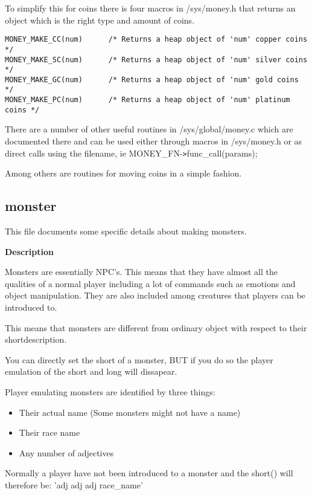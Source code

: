 To simplify this for coins there is four macros in /sys/money.h that
returns an object which is the right type and amount of coins.

\begin{verbatim}
MONEY_MAKE_CC(num)      /* Returns a heap object of 'num' copper coins */
MONEY_MAKE_SC(num)      /* Returns a heap object of 'num' silver coins */
MONEY_MAKE_GC(num)      /* Returns a heap object of 'num' gold coins */
MONEY_MAKE_PC(num)      /* Returns a heap object of 'num' platinum coins */
\end{verbatim}

There are a number of other useful routines in /sys/global/money.c which
are documented there and can be used either through macros in /sys/money.h
or as direct calls using the filename, ie MONEY\_FN-\verb+>+func\_call(params);

Among others are routines for moving coins in a simple fashion.



\subsection{monster}

This file documents some specific details about making monsters. 

{\bf Description}

Monsters are essentially NPC's. This means that they have almost all the
qualities of a normal player including a lot of commands such as
emotions and object manipulation. They are also included among creatures
that players can be introduced to.

This means that monsters are different from ordinary object with respect
to their shortdescription. 

You can directly set the short of a monster, BUT if you do so the player
emulation of the short and long will dissapear.

Player emulating monsters are identified by three things:

\begin{itemize}
    \item  Their actual name (Some monsters might not have a name)
    \item  Their race name
    \item  Any number of adjectives
\end{itemize}

Normally a player have not been introduced to a monster and the short() will
therefore be: 'adj adj adj race\_name'

